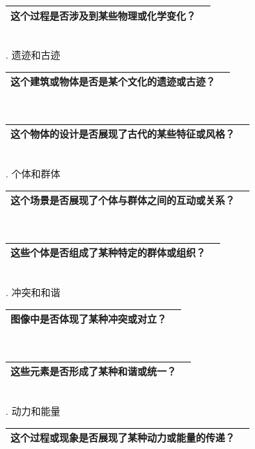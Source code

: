 \documentclass[12pt]{book}
\begin{document}
\begin{tabular}{|p{15cm}|p{3cm}|}
	\hline
这个过程是否涉及到某些物理或化学变化？\\
	\hline
\end{tabular}\\


. 遗迹和古迹

\begin{tabular}{|p{15cm}|p{3cm}|}
	\hline
这个建筑或物体是否是某个文化的遗迹或古迹？\\
	\hline
\end{tabular}\\


\begin{tabular}{|p{15cm}|p{3cm}|}
	\hline
这个物体的设计是否展现了古代的某些特征或风格？\\
	\hline
\end{tabular}\\


. 个体和群体

\begin{tabular}{|p{15cm}|p{3cm}|}
	\hline
这个场景是否展现了个体与群体之间的互动或关系？\\
	\hline
\end{tabular}\\



\begin{tabular}{|p{15cm}|p{3cm}|}
	\hline
这些个体是否组成了某种特定的群体或组织？\\
	\hline
\end{tabular}\\



. 冲突和和谐

\begin{tabular}{|p{15cm}|p{3cm}|}
	\hline
图像中是否体现了某种冲突或对立？\\
	\hline
\end{tabular}\\


\begin{tabular}{|p{15cm}|p{3cm}|}
	\hline
这些元素是否形成了某种和谐或统一？\\
	\hline
\end{tabular}\\

. 动力和能量

\begin{tabular}{|p{15cm}|p{3cm}|}
	\hline
这个过程或现象是否展现了某种动力或能量的传递？\\
	\hline
\end{tabular}\\
\end{document}
